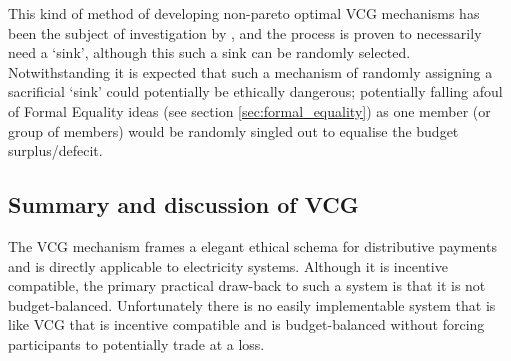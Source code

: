 This kind of method of developing non-pareto optimal VCG mechanisms has been the subject of investigation by \cite{NATH2019673}, and the process is proven to necessarily need a `sink', although this such a sink can be randomly selected.
Notwithstanding it is expected that such a mechanism of randomly assigning a sacrificial `sink' could potentially be ethically dangerous; potentially falling afoul of Formal Equality ideas (see section \ref{sec:formal_equality}) as one member (or group of members) would be randomly singled out to equalise the budget surplus/defecit.







\subsection{Summary and discussion of VCG}\label{subsec:summary_discussion_VCG}

The VCG mechanism frames a elegant ethical schema for distributive payments and is directly applicable to electricity systems.
Although it is incentive compatible, the primary practical draw-back to such a system is that it is not budget-balanced.
Unfortunately there is no easily implementable system that is like VCG that is incentive compatible and is budget-balanced without forcing participants to potentially trade at a loss.

